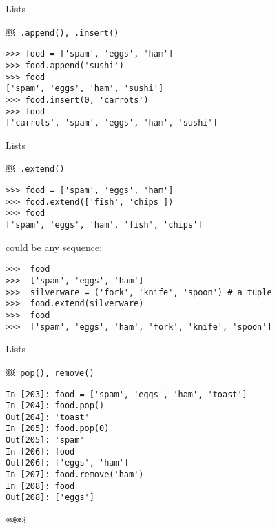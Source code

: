 \documentclass{beamer}
\begin{document}
\begin{frame}[fragile]{Lists}

{\Large ￼\verb| .append(), .insert()|}

\begin{verbatim}
>>> food = ['spam', 'eggs', 'ham']
>>> food.append('sushi')
>>> food
['spam', 'eggs', 'ham', 'sushi']
>>> food.insert(0, 'carrots')
>>> food
['carrots', 'spam', 'eggs', 'ham', 'sushi']
\end{verbatim}

\end{frame} 

\begin{frame}[fragile]{Lists}

{\large ￼\verb| .extend()|}

\begin{verbatim}
>>> food = ['spam', 'eggs', 'ham']
>>> food.extend(['fish', 'chips'])
>>> food
['spam', 'eggs', 'ham', 'fish', 'chips']
\end{verbatim}

{\large could be any sequence:}

\begin{verbatim}
>>>  food
>>>  ['spam', 'eggs', 'ham']
>>>  silverware = ('fork', 'knife', 'spoon') # a tuple
>>>  food.extend(silverware)
>>>  food
>>>  ['spam', 'eggs', 'ham', 'fork', 'knife', 'spoon']
\end{verbatim}

\end{frame} 

\begin{frame}[fragile]{Lists}

{\large ￼\verb|￼pop(), remove() |}

\begin{verbatim}
In [203]: food = ['spam', 'eggs', 'ham', 'toast']
In [204]: food.pop()
Out[204]: 'toast'
In [205]: food.pop(0)
Out[205]: 'spam'
In [206]: food
Out[206]: ['eggs', 'ham']
In [207]: food.remove('ham')
In [208]: food
Out[208]: ['eggs']
\end{verbatim}

\end{frame} 
￼￼
\end{document}
